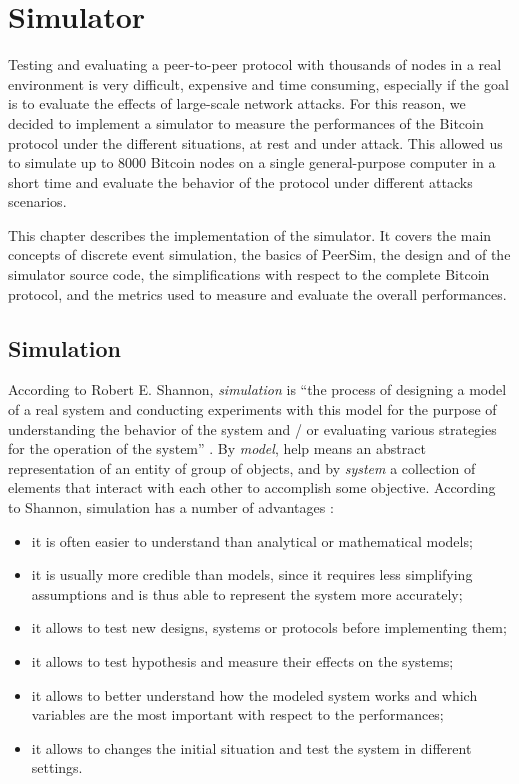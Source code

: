 \chapter{Simulator}
\label{chapter:simulator}

Testing and evaluating a peer-to-peer protocol with thousands of nodes in a real environment is very difficult, expensive and time consuming, especially if the goal is to evaluate the effects of large-scale network attacks.
For this reason, we decided to implement a simulator to measure the performances of the Bitcoin protocol under the different situations, at rest and under attack.
This allowed us to simulate up to \num{8000} Bitcoin nodes on a single general-purpose computer in a short time and evaluate the behavior of the protocol under different attacks scenarios.

\medskip
This chapter describes the implementation of the simulator.
It covers the main concepts of discrete event simulation, the basics of PeerSim, the design and of the simulator source code, the simplifications with respect to the complete Bitcoin protocol, and the metrics used to measure and evaluate the overall performances.


\section{Simulation}
According to Robert E. Shannon, \textit{simulation} is ``the process of designing a model of a real system and conducting experiments with this model for the purpose of understanding the behavior of the system and / or evaluating various strategies for the operation of the system'' \cite{simulation_shannon_1998}.
By \textit{model}, help means an abstract representation of an entity of group of objects, and by \textit{system} a collection of elements that interact with each other to accomplish some objective.
According to Shannon, simulation has a number of advantages \cite{simulation_shannon_1998}:
\begin{itemize}
	\item it is often easier to understand than analytical or mathematical models;
	\item it is usually more credible than models, since it requires less simplifying assumptions and is thus able to represent the system more accurately;
	\item it allows to test new designs, systems or protocols before implementing them;
	\item it allows to test hypothesis and measure their effects on the systems;
	\item it allows to better understand how the modeled system works and which variables are the most important with respect to the performances;
	\item it allows to changes the initial situation and test the system in different settings.
\end{itemize}

